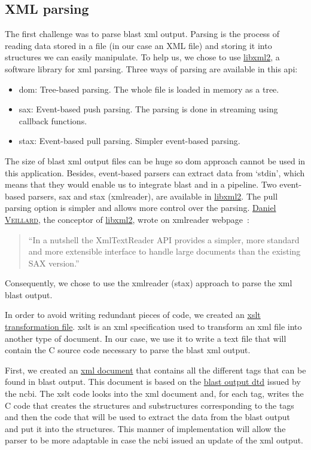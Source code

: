 \subsection{XML parsing}
The first challenge was to parse \gls{blast} \gls{xml} output.
Parsing is the process of reading data stored in a file (in our case an XML file) and storing it into structures we can easily manipulate.
To help us, we chose to use \href{http://www.xmlsoft.org/}{libxml2}, a software library for \gls{xml} parsing.
Three ways of parsing are available in this \acrfull{api}:
\begin{itemize}
    \item \gls{dom}: Tree-based parsing. The whole file is loaded in memory as a tree.
    \item \gls{sax}: Event-based push parsing. The parsing is done in streaming using callback functions.
    \item \gls{stax}: Event-based pull parsing. Simpler event-based parsing.
\end{itemize}
The size of \gls{blast} \gls{xml} output files can be huge so \gls{dom} approach cannot be used in this application.
Besides, event-based parsers can extract data from `stdin', which means that they would enable us to integrate \gls{blast} and \blastobam{} in a pipeline.
Two event-based parsers, \gls{sax} and \gls{stax} (xmlreader), are available in \href{http://www.xmlsoft.org/}{libxml2}.
The pull parsing option is simpler and allows more control over the parsing.
\href{xml@gnome.org}{Daniel \textsc{Veillard}}, the conceptor of \href{http://www.xmlsoft.org/}{libxml2}, wrote on xmlreader webpage~\cite{website:libxml:xmlreader}:
\begin{quote}
``In a nutshell the XmlTextReader API provides a simpler, more standard and more extensible interface to handle large documents than the existing SAX version.''
\end{quote}
Consequently, we chose to use the xmlreader (\gls{stax}) approach to parse the \gls{xml} \gls{blast} output.

In order to avoid writing redundant pieces of code, we created an \href{https://github.com/guyduche/Blast2Bam/blob/master/src/schema2c.xsl}{\acrshort{xslt} transformation file}.
\gls{xslt} is an \gls{xml} specification used to transform an \gls{xml} file into another type of document.
In our case, we use it to write a text file that will contain the C source code necessary to parse the \gls{blast} \gls{xml} output.

First, we created an \href{https://github.com/guyduche/Blast2Bam/blob/master/src/schema.xml}{\gls{xml} document} that contains all the different tags that can be found in \gls{blast} output. This document is based on the \href{http://www.ncbi.nlm.nih.gov/dtd/NCBI_BlastOutput.mod.dtd}{\gls{blast} output \gls{dtd}} issued by the \gls{ncbi}.
The \gls{xslt} code looks into the \gls{xml} document and, for each tag, writes the C code that creates the structures and substructures corresponding to the tags and then the code that will be used to extract the data from the \gls{blast} output and put it into the structures.
This manner of implementation will allow the parser to be more adaptable in case the \gls{ncbi} issued an update of the \gls{xml} output.

